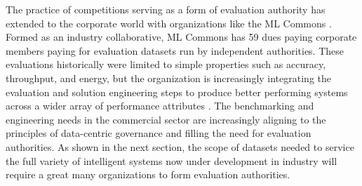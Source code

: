 The practice of competitions serving as a form of evaluation authority has extended to the corporate world with organizations like the ML Commons \cite{ml_commons_mlcommons_2022}. Formed as an industry collaborative, ML Commons has 59 dues paying corporate members paying for evaluation datasets run by independent authorities. These evaluations historically were limited to simple properties such as accuracy, throughput, and energy, but the organization is increasingly integrating the evaluation and solution engineering steps to produce better performing systems across a wider array of performance attributes \cite{mazumder_dataperf_2022}. The benchmarking and engineering needs in the commercial sector are increasingly aligning to the principles of data-centric governance and filling the need for evaluation authorities. As shown in the next section, the scope of datasets needed to service the full variety of intelligent systems now under development in industry will require a great many organizations to form evaluation authorities.